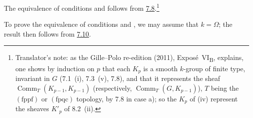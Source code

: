 The equivalence of conditions \textup{} and \textup{} follows
from \hyperref[prop:sga3-VIB-7.8]{7.8}.\footnote{Translator's note: as the Gille--Polo re-edition (2011),
Exposé~VI\textsubscript{B}, explains, one shows by induction on \(p\) that each \(K_p\) is a smooth \(k\)-group
of finite type, invariant in \(G\) (7.1~(i), 7.3~(v), 7.8), and that it represents the sheaf
\(\operatorname{Comm}_T(K_{p-1},K_{p-1})\) \textup{(}respectively,
\(\operatorname{Comm}_T(G,K_{p-1})\)\textup{)}, \(T\) being the \((\mathrm{fppf})\) or \((\mathrm{fpqc})\)
topology, by 7.8 in case a); so the \(K_p\) of \textup{(iv)} represent the sheaves \(K'_p\) of 8.2~(ii).}

To prove the equivalence of conditions \textup{} and
\textup{}, we may assume that \(k=\Omega\); the result then
follows from \hyperref[cor:sga3-VIB-7.10]{7.10}.
